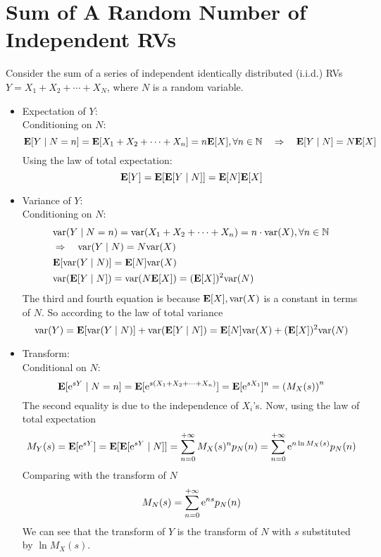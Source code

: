 \documentclass[device=normal, lang=en]{elegantbook}
\numberwithin{equation}{section}
\begin{document}
\section{Sum of A Random Number of Independent RVs}
Consider the sum of a series of independent identically distributed (i.i.d.) RVs $Y = X_1 + X_2 + \cdots + X_N$, where $N$ is a random variable. 
\begin{itemize}
    \item Expectation of $Y$: \\ 
    Conditioning on $N$: 
    \begin{equation}
        \mathbf{E}[Y \mid N = n] = \mathbf{E}[X_1 + X_2 + \cdots + X_n] = n \mathbf{E}[X], \forall n \in \mathbb{N} \quad\Rightarrow\quad \mathbf{E}[Y \mid N] = N \mathbf{E}[X]
    \end{equation}
    Using the law of total expectation:
    \begin{equation}
        \mathbf{E}[Y] = \mathbf{E}[\mathbf{E}[Y \mid N]] = \mathbf{E}[N] \mathbf{E}[X]
    \end{equation}
    \item Variance of $Y$: \\
    Conditioning on $N$:
    \begin{align}
        &\begin{aligned}
            &\mathrm{var}(Y \mid N = n) = \mathrm{var}(X_1 + X_2 + \cdots + X_n) = n \cdot \mathrm{var}(X), \forall n \in \mathbb{N} \\ 
            &\Rightarrow\quad \mathrm{var}(Y \mid N) = N \mathrm{var}(X) 
        \end{aligned} \\
        &\mathbf{E}[\mathrm{var}(Y \mid N)] = \mathbf{E}[N] \mathrm{var}(X) \\ 
        &\mathrm{var}(\mathbf{E}[Y \mid N]) = \mathrm{var}(N \mathbf{E}[X]) = (\mathbf{E}[X])^2 \mathrm{var}(N) 
    \end{align}
    The third and fourth equation is because $\mathbf{E}[X], \mathrm{var}(X)$ is a constant in terms of $N$. So according to the law of total variance
    \begin{equation}
        \mathrm{var}(Y) = \mathbf{E}[\mathrm{var}(Y \mid N)] + \mathrm{var}(\mathbf{E}[Y \mid N]) = \mathbf{E}[N] \mathrm{var}(X) + (\mathbf{E}[X])^2 \mathrm{var}(N)
    \end{equation}
    \item Transform: \\ 
    Conditional on $N$:
    \begin{equation}
        \mathbf{E}[\mathrm{e}^{sY} \mid N = n] = \mathbf{E}[\mathrm{e}^{s(X_1 + X_2 + \cdots + X_n)}] = \mathbf{E}[\mathrm{e}^{sX_1}]^n = \qty(M_{X}(s))^n
    \end{equation}
    The second equality is due to the independence of $X_i$'s. Now, using the law of total expectation
    \begin{equation}
        M_{Y}(s) = \mathbf{E}[\mathrm{e}^{sY}] = \mathbf{E}[\mathbf{E}[\mathrm{e}^{sY} \mid N]] = \sum_{n=0}^{+\infty} M_{X}(s)^n p_N(n) = \sum_{n=0}^{+\infty} \mathrm{e}^{n \ln M_{X}(s)} p_{N}(n)
    \end{equation}
    Comparing with the transform of $N$
    \begin{equation}
        M_{N}(s) = \sum_{n=0}^{+\infty} \mathrm{e}^{ns} p_{N}(n)
    \end{equation}
    We can see that the transform of $Y$ is the transform of $N$ with $s$ substituted by $\ln M_{X}(s)$.
 \end{itemize}

\appendix

\end{document}

